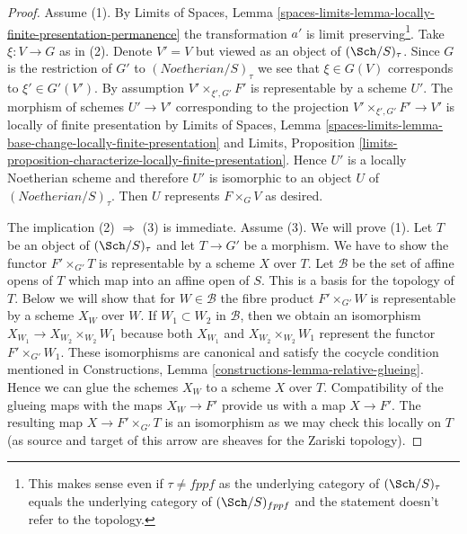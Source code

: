 \begin{proof}

Assume (1). By Limits of Spaces, Lemma
\ref{spaces-limits-lemma-locally-finite-presentation-permanence}
the transformation $a'$ is limit preserving\footnote{This
makes sense even if $\tau \not = fppf$ as the underlying
category of $(\Sch/S)_\tau$ equals the underlying category
of $(\Sch/S)_{fppf}$ and the statement doesn't refer to the topology.}.
Take $\xi : V \to G$ as in (2). Denote $V' = V$ but viewed as an
object of $(\Sch/S)_\tau$. Since $G$ is the restriction of
$G'$ to $(\textit{Noetherian}/S)_\tau$ we see that
$\xi \in G(V)$ corresponds to $\xi' \in G'(V')$.
By assumption $V' \times_{\xi', G'} F'$ is representable
by a scheme $U'$. The morphism of schemes $U' \to V'$ corresponding to
the projection $V' \times_{\xi', G'} F' \to V'$ is locally of finite
presentation by
Limits of Spaces, Lemma
\ref{spaces-limits-lemma-base-change-locally-finite-presentation} and
Limits, Proposition
\ref{limits-proposition-characterize-locally-finite-presentation}.
Hence $U'$ is a locally Noetherian scheme and therefore $U'$ is
isomorphic to an object $U$ of $(\textit{Noetherian}/S)_\tau$.
Then $U$ represents $F \times_G V$ as desired.

\medskip\noindent
The implication (2) $\Rightarrow$ (3) is immediate. Assume (3).
We will prove (1). Let $T$ be an object of $(\Sch/S)_\tau$
and let $T \to G'$ be a morphism. We have to show
the functor $F' \times_{G'} T$ is representable by a scheme $X$
over $T$. Let $\mathcal{B}$ be the set of affine opens of
$T$ which map into an affine open of $S$. This is a basis
for the topology of $T$. Below we will show that for $W \in \mathcal{B}$
the fibre product $F' \times_{G'} W$ is representable
by a scheme $X_W$ over $W$. If $W_1 \subset W_2$ in $\mathcal{B}$, then
we obtain an isomorphism $X_{W_1} \to X_{W_2} \times_{W_2} W_1$ because both
$X_{W_1}$ and $X_{W_2} \times_{W_2} W_1$ represent the functor
$F' \times_{G'} W_1$.
These isomorphisms are canonical and satisfy the cocycle condition
mentioned in Constructions, Lemma
\ref{constructions-lemma-relative-glueing}.
Hence we can glue the schemes $X_W$ to a scheme $X$ over $T$.
Compatibility of the glueing maps with the maps
$X_W \to F'$ provide us with a map $X \to F'$.
The resulting map $X \to F' \times_{G'} T$ is an
isomorphism as we may check this locally on $T$ (as source
and target of this arrow are sheaves for the Zariski topology).


\end{proof}
